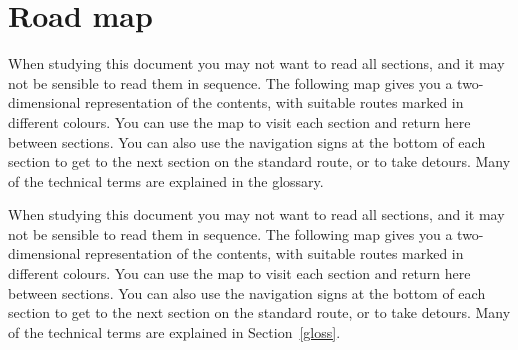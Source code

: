 \documentclass[11pt]{article}
\newenvironment{latexonly}{}{}
\newcommand{\htmlref}[2]{#1}
\newcommand{\xlabel}[1]{}
\begin{document}
\section{\label{roadmap}\xlabel{roadmap}Road map}

\begin{htmlonly}
   When studying this document you may not want to read all sections,
   and it may not be sensible to read them in sequence. The following
   map gives you a two-dimensional representation of the contents, with
   suitable routes marked in different colours. You can use the map to
   visit each section and return here between sections. You can
   also use the navigation signs at the bottom of each section to
   get to the next section on the standard route, or to take detours.
   Many of the technical terms are explained in the
\htmlref{glossary.}{gloss}
\end{htmlonly}
\begin{latexonly}
   When studying this document you may not want to read all sections,
   and it may not be sensible to read them in sequence. The following
   map gives you a two-dimensional representation of the contents, with
   suitable routes marked in different colours. You can use the map to
   visit each section and return here between sections. You can
   also use the navigation signs at the bottom of each section to
   get to the next section on the standard route, or to take detours.
   Many of the technical terms are explained in
Section~\ref{gloss}.
\end{latexonly}
\end{document}

